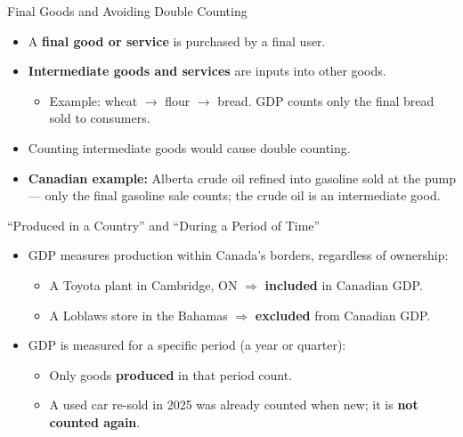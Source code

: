 \documentclass[aspectratio=169]{beamer}
\begin{document}
\begin{frame}{Final Goods and Avoiding Double Counting}
\transfade
\begin{itemize}
  \item A \textbf{final good or service} is purchased by a final user.
  \item \textbf{Intermediate goods and services} are inputs into other goods.
  \begin{itemize}
    \item Example: wheat $\to$ flour $\to$ bread. GDP counts only the final bread sold to consumers.
  \end{itemize}
  \item Counting intermediate goods would cause \alert{double counting}.
  \item \textbf{Canadian example:} Alberta crude oil refined into gasoline sold at the pump --- only the final gasoline sale counts; the crude oil is an intermediate good.
\end{itemize}
\end{frame}

\begin{frame}{``Produced in a Country'' and ``During a Period of Time''}
\transfade
\begin{itemize}
  \item GDP measures production within \alert{Canada's borders}, regardless of ownership:
  \begin{itemize}
    \item A Toyota plant in Cambridge, ON $\Rightarrow$ \textbf{included} in Canadian GDP.
    \item A Loblaws store in the Bahamas $\Rightarrow$ \textbf{excluded} from Canadian GDP.
  \end{itemize}
  \item GDP is measured for a specific period (a year or quarter):
  \begin{itemize}
    \item Only goods \textbf{produced} in that period count.
    \item A used car re-sold in 2025 was already counted when new; it is \textbf{not counted again}.
  \end{itemize}
\end{itemize}
\end{frame}
\end{document}
